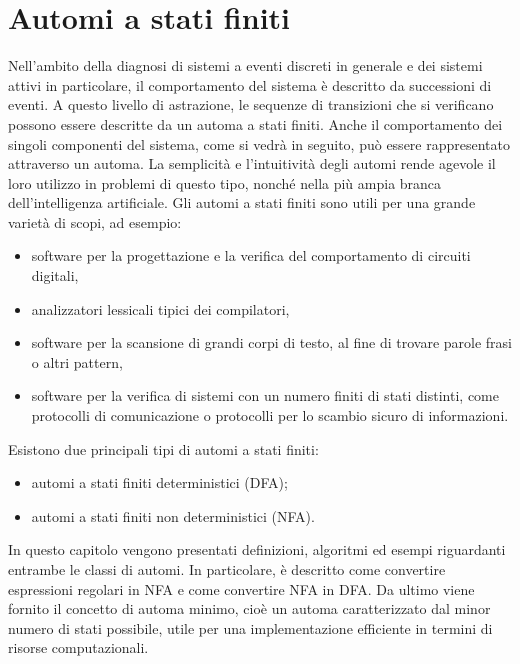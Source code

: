 \chapter{Automi a stati finiti}
Nell'ambito della diagnosi di sistemi a eventi discreti in generale e dei sistemi attivi in particolare, il comportamento del sistema è descritto da successioni di eventi. A questo livello di astrazione, le sequenze di transizioni che si verificano possono essere descritte da un automa a stati finiti. Anche il comportamento dei singoli componenti del sistema, come si vedrà in seguito, può essere rappresentato attraverso un automa. La semplicità e l'intuitività degli automi rende agevole il loro utilizzo in problemi di questo tipo, nonché nella più ampia branca dell'intelligenza artificiale.
Gli automi a stati finiti sono utili per una grande varietà di scopi, ad esempio:
\begin{itemize}
\item software per la progettazione e la verifica del comportamento di circuiti digitali,
\item analizzatori lessicali tipici dei compilatori,
\item software per la scansione di grandi corpi di testo, al fine di trovare parole frasi o altri pattern,
\item software per la verifica di sistemi con un numero finiti di stati distinti, come protocolli di comunicazione o protocolli per lo scambio sicuro di informazioni.
\end{itemize}
Esistono due principali tipi di automi a stati finiti:
\begin{itemize}
\item automi a stati finiti deterministici (DFA);
\item automi a stati finiti non deterministici (NFA).
\end{itemize}
In questo capitolo vengono presentati definizioni, algoritmi ed esempi riguardanti entrambe le classi di automi. In particolare, è descritto come convertire espressioni regolari in NFA e come convertire NFA in DFA.
Da ultimo viene fornito il concetto di automa minimo, cioè un automa caratterizzato dal minor numero di stati possibile, utile per una implementazione efficiente in termini di risorse computazionali.

\newpage
